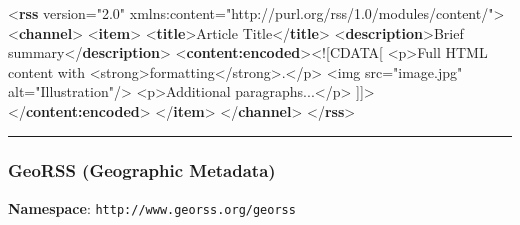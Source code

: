 \documentclass[
  letterpaper,
  DIV=11,
  numbers=noendperiod]{scrartcl}
\newenvironment{Shaded}{\begin{snugshade}}{\end{snugshade}}
\newcommand{\BaseNTok}[1]{\textcolor[rgb]{0.68,0.00,0.00}{#1}}
\newcommand{\KeywordTok}[1]{\textcolor[rgb]{0.00,0.23,0.31}{\textbf{#1}}}
\newcommand{\NormalTok}[1]{\textcolor[rgb]{0.00,0.23,0.31}{#1}}
\newcommand{\OtherTok}[1]{\textcolor[rgb]{0.00,0.23,0.31}{#1}}
\newcommand{\StringTok}[1]{\textcolor[rgb]{0.13,0.47,0.30}{#1}}
\begin{document}
\begin{Shaded}
\begin{Highlighting}[]
\NormalTok{\textless{}}\KeywordTok{rss}\OtherTok{ version=}\StringTok{"2.0"} 
\OtherTok{     xmlns:content=}\StringTok{"http://purl.org/rss/1.0/modules/content/"}\NormalTok{\textgreater{}}
\NormalTok{  \textless{}}\KeywordTok{channel}\NormalTok{\textgreater{}}
\NormalTok{  \textless{}}\KeywordTok{item}\NormalTok{\textgreater{}}
\NormalTok{      \textless{}}\KeywordTok{title}\NormalTok{\textgreater{}Article Title\textless{}/}\KeywordTok{title}\NormalTok{\textgreater{}}
\NormalTok{      \textless{}}\KeywordTok{description}\NormalTok{\textgreater{}Brief summary\textless{}/}\KeywordTok{description}\NormalTok{\textgreater{}}
\NormalTok{      \textless{}}\KeywordTok{content:encoded}\NormalTok{\textgreater{}}\BaseNTok{\textless{}![CDATA[}
\NormalTok{    \textless{}p\textgreater{}Full HTML content with \textless{}strong\textgreater{}formatting\textless{}/strong\textgreater{}.\textless{}/p\textgreater{}}
\NormalTok{        \textless{}img src="image.jpg" alt="Illustration"/\textgreater{}}
\NormalTok{        \textless{}p\textgreater{}Additional paragraphs...\textless{}/p\textgreater{}}
      \BaseNTok{]]\textgreater{}}\NormalTok{\textless{}/}\KeywordTok{content:encoded}\NormalTok{\textgreater{}}
\NormalTok{    \textless{}/}\KeywordTok{item}\NormalTok{\textgreater{}}
\NormalTok{  \textless{}/}\KeywordTok{channel}\NormalTok{\textgreater{}}
\NormalTok{\textless{}/}\KeywordTok{rss}\NormalTok{\textgreater{}}
\end{Highlighting}
\end{Shaded}

\begin{center}\rule{0.5\linewidth}{0.5pt}\end{center}

\subsubsection{GeoRSS (Geographic
Metadata)}\label{georss-geographic-metadata}

\textbf{Namespace}: \texttt{http://www.georss.org/georss}
\end{document}
